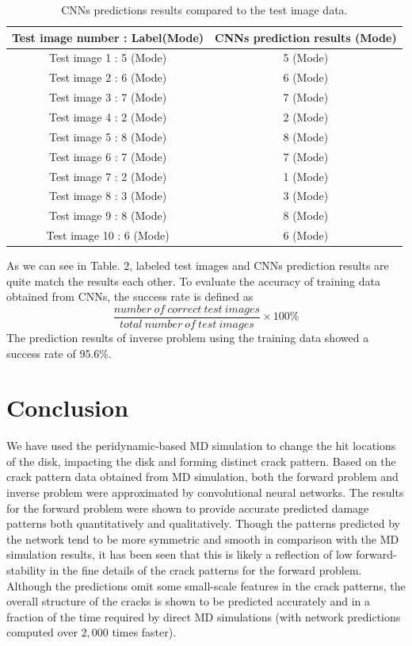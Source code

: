\begin{table}[h!]
\centering
\caption{CNNs predictions results compared to the test image data.}
\label{tab:1}       
\begin{tabular}{c|c}
\hline
\hline
Test image number : Label(Mode) & CNNs prediction results (Mode) \\
\hline
Test image 1 : 5 (Mode) & 5 (Mode) \\
Test image 2 : 6 (Mode) & 6 (Mode) \\
Test image 3 : 7 (Mode) & 7 (Mode) \\
Test image 4 : 2 (Mode) & 2 (Mode) \\
Test image 5 : 8 (Mode) & 8 (Mode) \\
Test image 6 : 7 (Mode) & 7 (Mode) \\
Test image 7 : 2 (Mode) & 1 (Mode) \\
Test image 8 : 3 (Mode) & 3 (Mode) \\
Test image 9 : 8 (Mode) & 8 (Mode) \\
Test image 10 : 6 (Mode) & 6 (Mode) \\
\hline
\end{tabular}
\end{table}
As we can see in Table. 2, labeled test images and CNNs prediction results are quite match the results each other. To evaluate the accuracy of training data obtained from CNNs, the success rate is defined as
\begin{equation} 
\frac{number\ of\ correct\ test\ images}{total\ number\ of\ test\ images} \times 100\%
\end{equation}
The prediction results of inverse problem using the training data showed a success rate of 95.6\%.
\section{Conclusion}
\label{sec:5}


We have used the peridynamic-based MD simulation to change the hit locations of the disk, impacting the disk and forming distinct crack pattern. Based on the crack pattern data obtained from MD simulation, both the forward problem and inverse problem were approximated by convolutional neural networks.  The results for the forward problem were shown to provide accurate predicted damage patterns both quantitatively and qualitatively.  Though the patterns predicted by the network tend to be more symmetric and smooth in comparison with the MD simulation results, it has been seen that this is likely a reflection of low forward-stability in the fine details of the crack patterns for the forward problem.  Although the predictions omit some small-scale features in the crack patterns, the overall structure of the cracks is shown to be predicted accurately and in a fraction of the time required by direct MD simulations (with network predictions computed over $2,000$ times faster).

